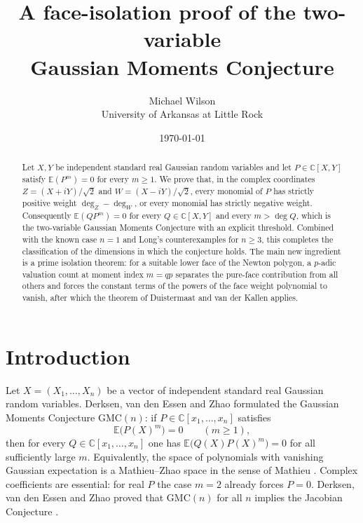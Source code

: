 \documentclass[11pt]{amsart}
\theoremstyle{plain}
\theoremstyle{remark}
\numberwithin{equation}{section}
\newcommand{\C}{\mathbb{C}}
\newcommand{\E}{\mathbb{E}}
\newcommand{\GMC}{\mathrm{GMC}}
\begin{document}
\title[A face-isolation proof of GMC(2)]
      {A face-isolation proof of the two-variable\\ Gaussian Moments Conjecture}

\author{Michael Wilson \\ \small University of Arkansas at Little Rock}

\date{\today}



\begin{abstract}
Let $X,Y$ be independent standard real Gaussian random variables and let
$P\in\C[X,Y]$ satisfy $\E(P^m)=0$ for every $m\ge1$. We prove that, in the
complex coordinates $Z=(X+iY)/\sqrt2$ and $W=(X-iY)/\sqrt2$, every monomial of
$P$ has strictly positive weight $\deg_Z-\deg_W$, or every monomial has
strictly negative weight. Consequently $\E(QP^m)=0$ for every $Q\in\C[X,Y]$ and
every $m>\deg Q$, which is the two-variable Gaussian Moments Conjecture with an
explicit threshold. Combined with the known case $n=1$ and Long's
counterexamples for $n\ge3$, this completes the classification of the
dimensions in which the conjecture holds. The main new ingredient is a prime
isolation theorem: for a suitable lower face of the Newton polygon, a
$p$-adic valuation count at moment index $m=qp$ separates the pure-face
contribution from all others and forces the constant terms of the powers of the
face weight polynomial to vanish, after which the theorem of Duistermaat and
van der Kallen applies.
\end{abstract}

\maketitle

\section{Introduction}\label{sec:intro}

Let $X=(X_1,\dots,X_n)$ be a vector of independent standard real Gaussian random
variables. Derksen, van den Essen and Zhao \cite{DvdEZ} formulated the Gaussian
Moments Conjecture $\GMC(n)$: if $P\in\C[x_1,\dots,x_n]$ satisfies
\begin{equation}\label{eq:hyp}
  \E\bigl(P(X)^m\bigr)=0 \qquad (m\ge1),
\end{equation}
then for every $Q\in\C[x_1,\dots,x_n]$ one has $\E\bigl(Q(X)P(X)^m\bigr)=0$ for
all sufficiently large $m$. Equivalently, the space of polynomials with
vanishing Gaussian expectation is a Mathieu--Zhao space in the sense of Mathieu
\cite{Mathieu}. Complex coefficients are essential: for real $P$ the case $m=2$
already forces $P=0$. Derksen, van den Essen and Zhao proved that $\GMC(n)$ for
all $n$ implies the Jacobian Conjecture \cite[Thm.~1.6]{DvdEZ}.
\end{document}
